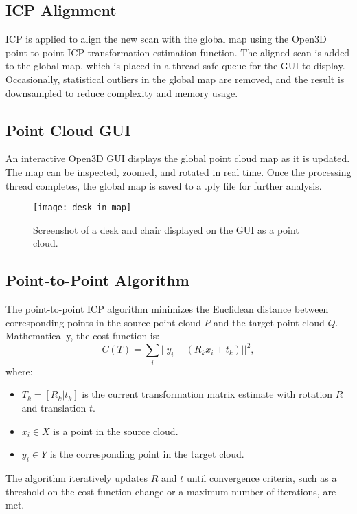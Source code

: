 \documentclass[conference]{IEEEtran}
\begin{document}
    \subsection{ICP Alignment}
    ICP is applied to align the new scan with the global map using the Open3D point-to-point
    ICP transformation estimation function.
    The aligned scan is added to the global map, which is placed in a thread-safe queue for the GUI to display.
    Occasionally, statistical outliers in the global map are removed, and the result is downsampled
    to reduce complexity and memory usage.

    \subsection{Point Cloud GUI}
    An interactive Open3D GUI displays the global point cloud map as it is updated.
    The map can be inspected, zoomed, and rotated in real time.
    Once the processing thread completes, the global map is saved to a .ply file for further analysis.

    \begin{figure}[htbp]
        \centering
        \texttt{[image: desk\_in\_map]}
        \caption{Screenshot of a desk and chair displayed on the GUI as a point cloud.}
        \label{fig:desk_in_map}
    \end{figure}

    \subsection{Point-to-Point Algorithm}
    The point-to-point ICP algorithm minimizes the Euclidean distance between corresponding points
    in the source point cloud $P$ and the target point cloud $Q$.
    Mathematically, the cost function is:
    \begin{equation}
        C(T) = \sum_{i} ||y_i - (R_k x_i + t_k)||^2,
    \end{equation}
    where:
    \begin{itemize}
        \item $T_k = [R_k|t_k]$ is the current transformation matrix estimate with rotation $R$ and translation $t$.
        \item $x_i \in X$ is a point in the source cloud.
        \item $y_i \in Y$ is the corresponding point in the target cloud.
    \end{itemize}
    The algorithm iteratively updates $R$ and $t$ until convergence criteria, such as a threshold
    on the cost function change or a maximum number of iterations, are met.
\end{document}
